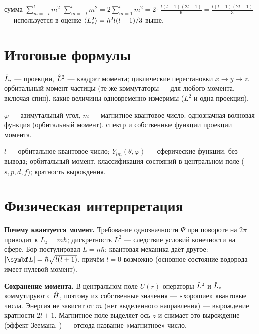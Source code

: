 \begin{derivation}[label=der:9:sum]{сумма $\sum_{m=-l}^{l}m^2$}
$\sum_{m=-l}^{l}m^2=2\sum_{m=1}^{l}m^2=2\cdot\frac{l(l+1)(2l+1)}{6}=\frac{l(l+1)(2l+1)}{3}$ — используется в оценке
$\langle L_z^2\rangle=\hbar^2l(l+1)/3$ выше.
\end{derivation}

\section{Итоговые формулы}

 {$\hat{L}_i$ — проекции, $\hat{L}^2$ — квадрат момента; циклические перестановки $x\to y\to z$.}
 {орбитальный момент частицы (те же коммутаторы — для любого момента, включая спин).}
 {какие величины одновременно измеримы ($L^2$ и одна проекция).}

 {$\varphi$ — азимутальный угол, $m$ — магнитное квантовое число.}
 {однозначная волновая функция (орбитальный момент).}
 {спектр и собственные функции проекции момента.}

 {$l$ — орбитальное квантовое число; $Y_{lm}(\theta,\varphi)$ — сферические функции.}
 {без вывода; орбитальный момент.}
 {классификация состояний в центральном поле ($s,p,d,f$); кратность вырождения.}

\section{Физическая интерпретация}

\textbf{Почему квантуется момент.} Требование однозначности $\Psi$ при повороте на $2\pi$ приводит
к $L_z=m\hbar$; дискретность $L^2$ — следствие условий конечности на сфере. Бор постулировал
$L=n\hbar$; квантовая механика даёт другое: $|\vect L|=\hbar\sqrt{l(l+1)}$, причём $l=0$ возможно
(основное состояние водорода имеет нулевой момент).

\textbf{Сохранение момента.} В центральном поле $U(r)$ операторы $\hat{L}^2$ и $\hat{L}_z$ коммутируют с
$\hat{H}$, поэтому их собственные значения — «хорошие» квантовые числа. Энергия не зависит от $m$
(нет выделенного направления) — вырождение кратности $2l+1$. Магнитное поле выделяет ось $z$ и
снимает это вырождение (эффект Зеемана, ) — отсюда название «магнитное» число.

